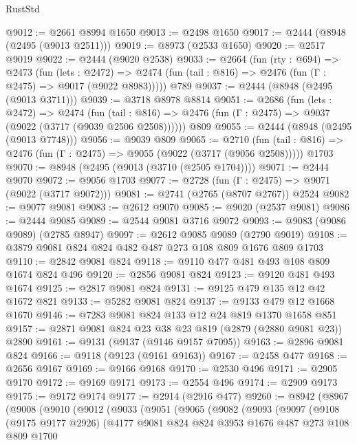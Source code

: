 \begin{lexlean}{RustStd}
\begin{coremodule}
@9012 := @2661 @8994 @1650
@9013 := @2498 @1650
@9017 := @2444 (@8948 (@2495 (@9013 @2511)))
@9019 := @8973 (@2533 @1650)
@9020 := @2517 @9019
@9022 := @2444 (@9020 @2538)
@9033 := @2664
    (fun (rty : @694) =>
    @2473
      (fun (lets : @2472) =>
      @2474 (fun (tail : @816) => @2476 (fun (Γ : @2475) => @9017 (@9022 @8983)))))
    @789
@9037 := @2444 (@8948 (@2495 (@9013 @3711)))
@9039 := @3718 @8978 @8814
@9051 := @2686
    (fun (lets : @2472) =>
    @2474
      (fun (tail : @816) => @2476 (fun (Γ : @2475) => @9037 (@9022 (@3717 (@9039 @2506 @2508))))))
    @809
@9055 := @2444 (@8948 (@2495 (@9013 @7748)))
@9056 := @9039 @809
@9065 := @2710
    (fun (tail : @816) => @2476 (fun (Γ : @2475) => @9055 (@9022 (@3717 (@9056 @2508)))))
    @1703
@9070 := @8948 (@2495 (@9013 (@3710 (@2505 @1704))))
@9071 := @2444 @9070
@9072 := @9056 @1703
@9077 := @2728 (fun (Γ : @2475) => @9071 (@9022 (@3717 @9072)))
@9081 := @2741 (@2765 (@8707 @2767)) @2524
@9082 := @9077 @9081
@9083 := @2612 @9070
@9085 := @9020 (@2537 @9081)
@9086 := @2444 @9085
@9089 := @2544 @9081 @3716 @9072
@9093 := @9083 (@9086 @9089) (@2785 @8947)
@9097 := @2612 @9085 @9089 (@2790 @9019)
@9108 := @3879 @9081 @824 @824 @482 @487 @273 @108 @809 @1676 @809 @1703
@9110 := @2842 @9081 @824
@9118 := @9110 @477 @481 @493 @108 @809 @1674 @824 @496
@9120 := @2856 @9081 @824
@9123 := @9120 @481 @493 @1674
@9125 := @2817 @9081 @824
@9131 := @9125 @479 @135 @12 @42 @1672 @821
@9133 := @5282 @9081 @824
@9137 := @9133 @479 @12 @1668 @1670
@9146 := @7283 @9081 @824 @133 @12 @24 @819 @1370 @1658 @851
@9157 := @2871 @9081 @824 @23 @38 @23 @819 (@2879 (@2880 @9081 @23)) @2890
@9161 := @9131 (@9137 (@9146 @9157 @7095))
@9163 := @2896 @9081 @824
@9166 := @9118 (@9123 (@9161 @9163))
@9167 := @2458 @477
@9168 := @2656 @9167
@9169 := @9166 @9168
@9170 := @2530 @496
@9171 := @2905 @9170
@9172 := @9169 @9171
@9173 := @2554 @496
@9174 := @2909 @9173
@9175 := @9172 @9174
@9177 := @2914 (@2916 @477)
@9260 := @8942
    (@8967
      (@9008
        (@9010
          (@9012
            (@9033
              (@9051
                (@9065
                  (@9082
                    (@9093
                      (@9097
                        (@9108
                          (@9175 @9177 @2926)
                          (@4177
                            @9081
                            @824
                            @824
                            @3953
                            @1676
                            @487
                            @273
                            @108
                            @809
                            @1700

\end{coremodule}
\end{lexlean}
